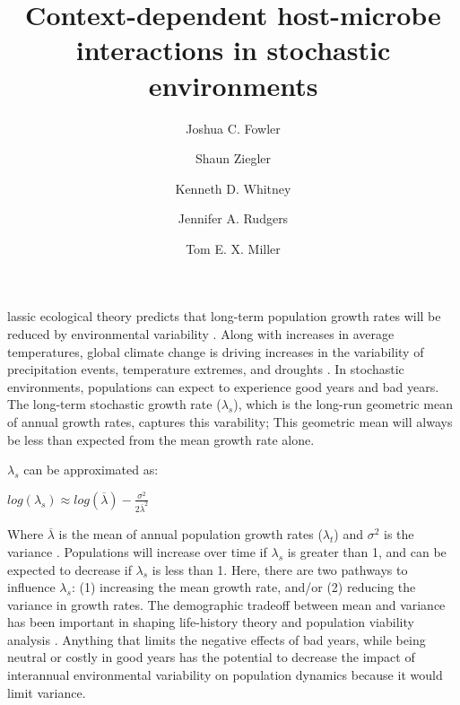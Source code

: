 \documentclass[9pt,twocolumn,twoside,lineno]{pnas-new}
\title{Context-dependent host-microbe interactions in stochastic environments}
\author[a,1]{Joshua C. Fowler}
\author[b]{Shaun Ziegler}
\author[b]{Kenneth D. Whitney}
\author[b]{Jennifer A. Rudgers}
\author[a]{Tom E. X. Miller}
\affil[a]{Rice University, Department of BioSciences, Houston, TX, 77005}
\affil[b]{University of New Mexico, Department of Biology, Albuquerque, NM, 87131}
\begin{document}


\maketitle
\thispagestyle{firststyle}


lassic ecological theory predicts that long-term population growth rates will be reduced by environmental variability \cite{lewontin_population_1969,tuljapurkar_population_1982}. Along with increases in average temperatures, global climate change is driving increases in the variability of precipitation events, temperature extremes, and droughts \cite{IPCC2012managing, seneviratne2012changes, stocker2013technical}. In stochastic environments, populations can expect to experience good years and bad years. The long-term stochastic growth rate ($\lambda_s$), which is the long-run geometric mean of annual growth rates, captures this varability; This geometric mean will always be less than expected from the mean growth rate alone. 

$\lambda_s$ can be approximated as: 

 $log(\lambda_s)  \approx log(\overline{\lambda}) - \frac{\sigma^2}{2\overline{\lambda}^2}$ 

Where $\overline{\lambda} $ is the mean of annual population growth rates ($\lambda_t$) and $\sigma^2$ is the variance \citep{lewontin_population_1969}. Populations will increase over time if $\lambda_s$ is greater than 1, and can be expected to decrease if $\lambda_s$ is less than 1. Here, there are two pathways to influence $\lambda_s$:  (1) increasing the mean growth rate, and/or (2) reducing the variance in growth rates. The demographic tradeoff between mean and variance has been important in shaping life-history theory  \cite{pfister1998patterns} and population viability analysis \cite{menges1990population}. Anything that limits the negative effects of bad years, while being neutral or costly in good years has the potential to decrease the impact of interannual environmental variability on population dynamics because it would limit variance. 
\end{document}
